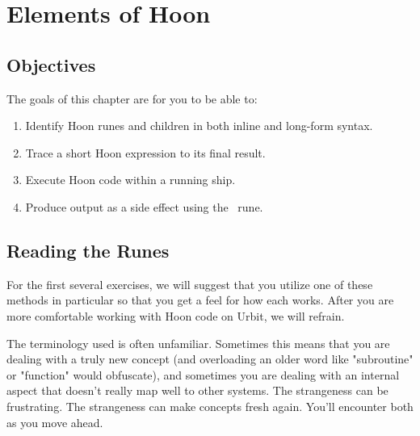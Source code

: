 \setchapterpreamble[u]{\margintoc}
\chapter{Elements of Hoon}

\section{Objectives}

The goals of this chapter are for you to be able to:

\begin{enumerate}
  \item  Identify Hoon runes and children in both inline and long-form syntax.
  \item  Trace a short Hoon expression to its final result.
  \item  Execute Hoon code within a running ship.
  \item  Produce output as a side effect using the \sigpam~rune.
\end{enumerate}

\section{Reading the Runes}



For the first several exercises, we will suggest that you utilize one of these methods in particular so that you get a feel for how each works.  After you are more comfortable working with Hoon code on Urbit, we will refrain.


The terminology used is often unfamiliar.  Sometimes this means that you are dealing with a truly new concept (and overloading an older word like "subroutine" or "function" would obfuscate), and sometimes you are dealing with an internal aspect that doesn't really map well to other systems.  The strangeness can be frustrating.  The strangeness can make concepts fresh again.  You'll encounter both as you move ahead.

